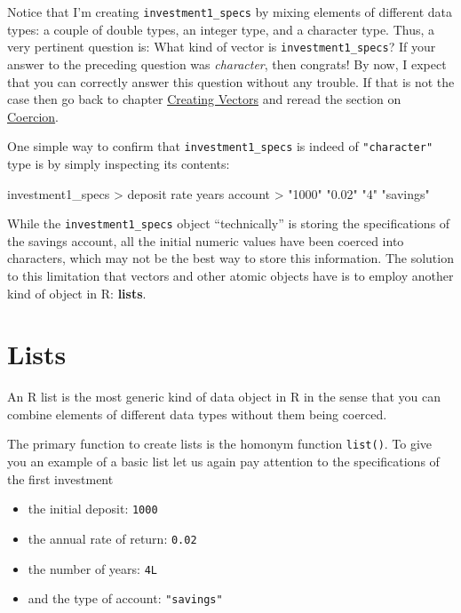 \documentclass[
]{book}
\newenvironment{Shaded}{\begin{snugshade}}{\end{snugshade}}
\newcommand{\NormalTok}[1]{#1}
\newcommand{\SpecialCharTok}[1]{\textcolor[rgb]{0.00,0.00,0.00}{#1}}
\newcommand{\StringTok}[1]{\textcolor[rgb]{0.31,0.60,0.02}{#1}}
\providecommand{\tightlist}{%
  \setlength{\itemsep}{0pt}\setlength{\parskip}{0pt}}
\begin{document}
Notice that I'm creating \texttt{investment1\_specs} by mixing elements of different
data types: a couple of double types, an integer type, and a character type.
Thus, a very pertinent question is: What kind of vector is \texttt{investment1\_specs}?
If your answer to the preceding question was \emph{character}, then congrats!
By now, I expect that you can correctly answer this question without any
trouble. If that is not the case then go back to chapter
\protect\hyperlink{vectors3}{Creating Vectors} and reread the section on \protect\hyperlink{coercion}{Coercion}.

One simple way to confirm that \texttt{investment1\_specs} is indeed of \texttt{"character"}
type is by simply inspecting its contents:

\begin{Shaded}
\begin{Highlighting}[]
\NormalTok{investment1\_specs}
\SpecialCharTok{\textgreater{}}\NormalTok{   deposit      rate     years   account }
\SpecialCharTok{\textgreater{}}    \StringTok{"1000"}    \StringTok{"0.02"}       \StringTok{"4"} \StringTok{"savings"}
\end{Highlighting}
\end{Shaded}

While the \texttt{investment1\_specs} object ``technically'' is storing the specifications
of the savings account, all the initial numeric values have been coerced into
characters, which may not be the best way to store this information. The
solution to this limitation that vectors and other atomic objects have is to
employ another kind of object in R: \textbf{lists}.

\hypertarget{lists-1}{%
\section{Lists}\label{lists-1}}

An R list is the most generic kind of data object in R in the sense that
you can combine elements of different data types without them being coerced.

The primary function to create lists is the homonym function \texttt{list()}. To give
you an example of a basic list let us again pay attention to the specifications
of the first investment

\begin{itemize}
\tightlist
\item
  the initial deposit: \texttt{1000}
\item
  the annual rate of return: \texttt{0.02}
\item
  the number of years: \texttt{4L}
\item
  and the type of account: \texttt{"savings"}
\end{itemize}
\end{document}
